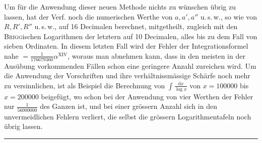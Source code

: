 Um für die Anwendung dieser neuen Methode nichts zu wünschen übrig zu
lassen, hat der Verf. noch die numerischen Werthe von \(a,a',a''\)
u.\,s.\,w., so wie von \(R,R',R''\) u.\,s.\,w., auf 16 Decimalen
berechnet, mitgetheilt, zugleich mit den \textsc{Brigg}ischen Logarithmen
der letztern auf 10 Decimalen, alles bis zu dem Fall von sieben Ordinaten.
In diesem letzten Fall wird der Fehler der Integrationsformel nahe
\(=\frac{1}{176679360}\alpha^{\mathrm{XIV}}\), woraus man abnehmen
kann, dass in den meisten in der Ausübung vorkommenden Fällen schon eine
geringere Anzahl zureichen wird. Um die Anwendung der Vorschriften und ihre
verhältnissmässige Schärfe noch mehr zu versinnlichen, ist als Beispiel die
Berechnung von \(\int\frac{\mathrm{d}x}{\log x}\) von \(x=100000\)
bis \(x=200000\) beigefügt, wo schon bei der Anwendung von vier Werthen
der Fehler nur \(\frac{1}{56000000}\) des Ganzen ist, und bei einer
grössern Anzahl sich in den unvermeidlichen Fehlern verliert, die selbst
die grössern Logarithmentafeln noch übrig lassen.
\par\begin{center}\rule{0.22\linewidth}{0.3pt}\end{center}
